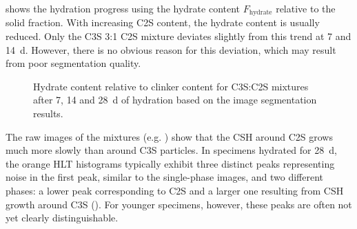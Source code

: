  shows the hydration progress using the hydrate content $F_\text{hydrate}$ relative to the solid fraction.
With increasing \ac{C2S} content, the hydrate content is usually reduced.
Only the \ac{C3S} 3:1 \ac{C2S} mixture deviates slightly from this trend at \num{7} and \qty{14}{\day}.
However, there is no obvious reason for this deviation, which may result from poor segmentation quality.

\begin{figure}[!htb]
	\centering
	\caption{%
		Hydrate content relative to clinker content for \ac{C3S}:\ac{C2S} mixtures after \num{7}, \num{14} and \qty{28}{\day} of hydration based on the image segmentation results.
	}
    \label{fig:hydrate_clinker_stacked_bar_mix}
\end{figure}

The raw images of the mixtures (e.g. ) show that the \ac{CSH} around \ac{C2S} grows much more slowly than around \ac{C3S} particles.
In specimens hydrated for \qty{28}{\day}, the orange \ac{HLT} histograms typically exhibit three distinct peaks representing noise in the first peak, similar to the single-phase images, and two different phases: a lower peak corresponding to \ac{C2S} and a larger one resulting from \ac{CSH} growth around \ac{C3S} ().
For younger specimens, however, these peaks are often not yet clearly distinguishable.

